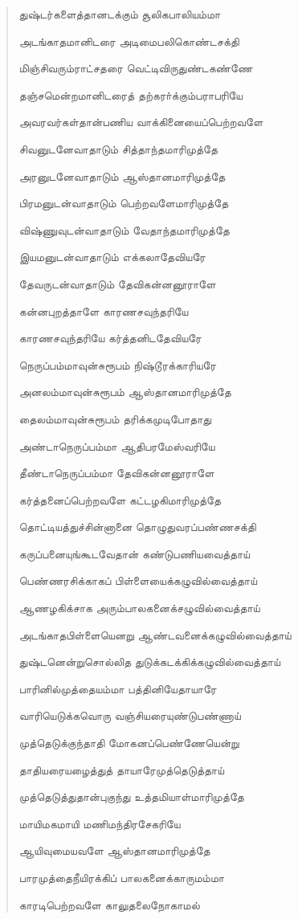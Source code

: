 \documentclass{article}
\begin{document}
\begin{quotation}
{துஷ்டர்களைத்தானடக்கும் சூலிகபாலியம்மா

அடங்காதமானிடரை அடிமைபலிகொண்டசக்தி

மிஞ்சிவரும்ராட்சதரை வெட்டிவிருதுண்டகண்ணே

தஞ்சமென்றமானிடரைத் தற்கரா்க்கும்பராபரியே

அவரவர்கள்தான்பணிய வாக்கினையைப்பெற்றவளே

சிவனுடனேவாதாடும் சித்தாந்தமாரிமுத்தே

அரனுடனேவாதாடும் ஆஸ்தானமாரிமுத்தே

பிரமனுடன்வாதாடும் பெற்றவளேமாரிமுத்தே

விஷ்ணுவுடன்வாதாடும் வேதாந்தமாரிமுத்தே

இயமனுடன்வாதாடும் எக்கலாதேவியரே

தேவருடன்வாதாடும் தேவிகன்னனூராளே

கன்னபுறத்தாளே காரணசவுந்தரியே

காரணசவுந்தரியே கர்த்தனிடதேவியரே

நெருப்பம்மாவுன்சுரூபம் நிஷ்டூரக்காரியரே

அனலம்மாவுன்சுரூபம் ஆஸ்தானமாரிமுத்தே

தைலம்மாவுன்சுரூபம் தரிக்கமுடிபோதாது

அண்டாநெருப்பம்மா ஆதிபரமேஸ்வரியே

தீண்டாநெருப்பம்மா தேவிகன்னனூராளே

கர்த்தனைப்பெற்றவளே கட்டழகிமாரிமுத்தே

தொட்டியத்துச்சின்னானை தொழுதுவரப்பண்ணசக்தி

கருப்பனையுங்கூடவேதான் கண்டுபணியவைத்தாய்

பெண்ணரசிக்காகப் பிள்ளையைக்கழுவில்வைத்தாய்

ஆணழகிக்சாக அரும்பாலகனைக்சழுவில்வைத்தாய்

அடங்காதபிள்ளையெனறு ஆண்டவனைக்கழுவில்வைத்தாய்

துஷ்டனென்றுசொல்லித துடுக்கடக்கிக்கழுவில்வைத்தாய்

பாரினில்முத்தையம்மா பத்தினியேதாயாரே

வாரியெடுக்கவொரு வஞ்சியரையுண்டுபண்ணாய்

முத்தெடுக்குந்தாதி மோகனப்பெண்ணேயென்று

தாதியரையழைத்துத் தாயாரேமுத்தெடுத்தாய்

முத்தெடுத்துதான்புகுந்து உத்தமியாள்மாரிமுத்தே

மாயிமகமாயி மணிமந்திரசேகரியே

ஆயிவுமையவளே ஆஸ்தானமாரிமுத்தே

பாரமுத்தைநீயிரக்கிப் பாலகனைக்காருமம்மா

காரடிபெற்றவளே காலுதலைநோகாமல்

}
\end{quotation}
\end{document}
